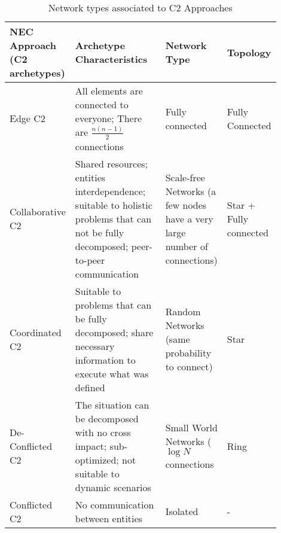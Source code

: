 \begin{table}[ht]
	\small
	\fontsize{6}{6}\selectfont
	\centering
	\caption{Network types associated to C2 Approaches}
	\label{table:nec}
	
	\begin{tabular}{p{0.1\linewidth}p{0.5\linewidth}p{0.2\linewidth}p{0.1\linewidth}}
	\hline
		\textbf{NEC Approach (C2 archetypes)}
		& \textbf{Archetype Characteristics}
		& \textbf{Network Type}
		& \textbf{Topology} \\ [1ex]
	\hline	
	Edge C2 & All elements are connected to everyone; There are $\frac{n(n-1)}{2}$ connections & Fully connected & Fully Connected \\[5ex]
	Collaborative C2 & Shared resources; entities interdependence; suitable to holistic problems that can not be fully decomposed; peer-to-peer communication & Scale-free Networks (a few nodes have a very large number of connections) & Star + Fully connected \\[5ex]
	Coordinated C2 & Suitable to problems that can be fully decomposed; share necessary information to execute what was defined & Random Networks (same probability to connect) & Star \\[5ex]
	De-Conflicted C2 & The situation can be decomposed with no cross impact; sub-optimized; not suitable to dynamic scenarios & Small World Networks ( $\log{N}$ connections & Ring \\[5ex]
	Conflicted C2 & No communication between entities & Isolated & - \\[1ex]
	\hline
	\end{tabular}
\end{table} 


